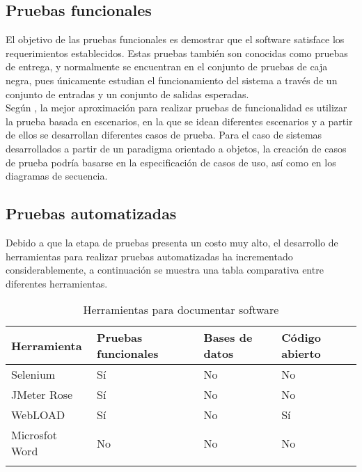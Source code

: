 \subsection{Pruebas funcionales}

El objetivo de las pruebas funcionales es demostrar que el software satisface los requerimientos establecidos. Estas pruebas también son conocidas como pruebas de entrega, y normalmente se encuentran en el conjunto de pruebas de caja negra, pues únicamente estudian el funcionamiento del sistema a través de un conjunto de entradas y un conjunto de salidas esperadas.\\

Según \cite{sommerville1992software}, la mejor aproximación para realizar pruebas de funcionalidad es utilizar la prueba basada en escenarios, en la que se idean diferentes escenarios y a partir de ellos se desarrollan diferentes casos de prueba. Para el caso de sistemas desarrollados a partir de un paradigma orientado a objetos, la creación de casos de prueba podría basarse en la especificación de casos de uso, así como en los diagramas de secuencia.


\subsection{Pruebas automatizadas}

Debido a que la etapa de pruebas presenta un costo muy alto, el desarrollo de herramientas para realizar pruebas automatizadas ha incrementado considerablemente, a continuación se muestra una tabla comparativa entre diferentes herramientas.


\begin{longtable}{| p{} | p{} | p{} | p{} |}%
	\arrayrulecolor{black}%
	\rowcolor{black}%
	{\color{white}Herramienta} & {\color{white}Pruebas funcionales} & {\color{white}Bases de datos} & {\color{white}Código abierto}\\ \hline
	\endhead%
	\arrayrulecolor{black}%
	Selenium & Sí & No & No\\ \hline
	JMeter Rose & Sí & No & No\\ \hline
	WebLOAD &  Sí & No & Sí\\ \hline
	Microsfot Word &  No & No & No\\ \hline
	\caption{Herramientas para documentar software}\label{fig:tablaAnalisis}
\end{longtable}%
